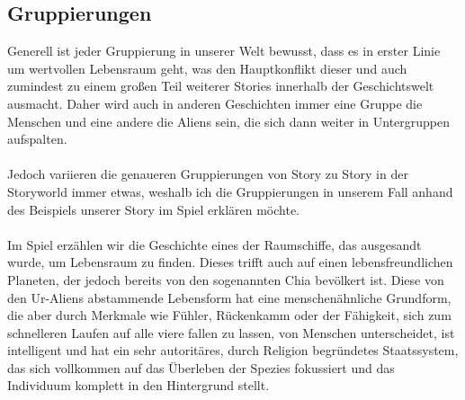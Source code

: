 \documentclass[12pt]{article}
\begin{document}
	
	\subsection{Gruppierungen}
	Generell ist jeder Gruppierung in unserer Welt bewusst, dass es in erster Linie um wertvollen Lebensraum
	geht, was den Hauptkonflikt dieser und auch zumindest zu einem großen Teil weiterer Stories innerhalb der Geschichtswelt ausmacht. Daher wird auch in anderen Geschichten immer eine Gruppe die Menschen und eine andere die Aliens sein, die sich dann weiter in Untergruppen aufspalten.\\
	\\
	Jedoch variieren die genaueren Gruppierungen von Story zu Story in der Storyworld immer etwas, weshalb ich die Gruppierungen in unserem Fall anhand des Beispiels unserer Story im Spiel erklären möchte.\\
	\\
	Im Spiel erzählen wir die Geschichte eines der Raumschiffe, das ausgesandt wurde, um Lebensraum zu finden. Dieses trifft auch auf einen lebensfreundlichen Planeten, der jedoch bereits von den sogenannten Chia bevölkert ist. Diese von den Ur-Aliens abstammende Lebensform hat eine menschenähnliche Grundform, die aber durch Merkmale wie Fühler, Rückenkamm oder der Fähigkeit, sich zum schnelleren Laufen auf alle viere fallen zu lassen, von Menschen unterscheidet, ist intelligent und hat ein sehr autoritäres, durch Religion begründetes Staatssystem, das sich vollkommen auf das Überleben der Spezies fokussiert und das Individuum komplett in den Hintergrund stellt.
\end{document}
